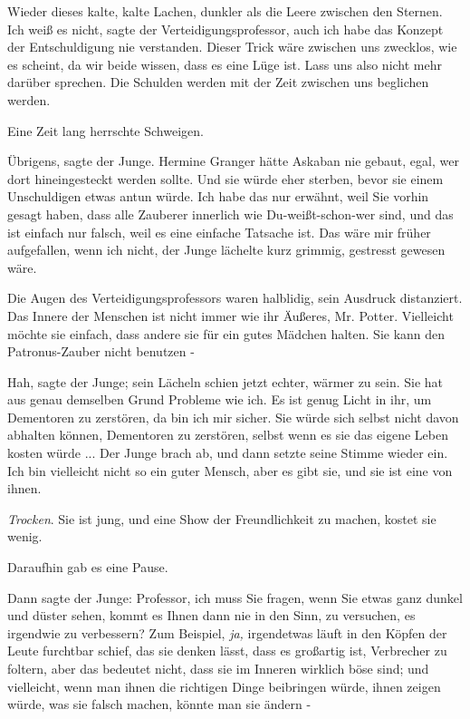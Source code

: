 Wieder dieses kalte, kalte Lachen, dunkler als die Leere zwischen den Sternen.
\glqq{}Ich weiß es nicht\grqq{}, sagte der Verteidigungsprofessor, \glqq{}auch ich
habe das Konzept der Entschuldigung nie verstanden. Dieser Trick wäre zwischen
uns zwecklos, wie es scheint, da wir beide wissen, dass es eine Lüge ist. Lass
uns also nicht mehr darüber sprechen. Die Schulden werden mit der Zeit zwischen
uns beglichen werden.\grqq{}

Eine Zeit lang herrschte Schweigen.

\glqq{}Übrigens\grqq{}, sagte der Junge. \glqq{}Hermine Granger hätte Askaban nie
gebaut, egal, wer dort hineingesteckt werden sollte. Und sie würde eher sterben,
bevor sie einem Unschuldigen etwas antun würde. Ich habe das nur erwähnt, weil
Sie vorhin gesagt haben, dass alle Zauberer innerlich wie Du-weißt-schon-wer
sind, und das ist einfach nur falsch, weil es eine einfache Tatsache ist. Das
wäre mir früher aufgefallen, wenn ich nicht\grqq{}, der Junge lächelte kurz
grimmig, \glqq{}gestresst gewesen wäre.\grqq{}

Die Augen des Verteidigungsprofessors waren halblidig, sein Ausdruck
distanziert. \glqq{}Das Innere der Menschen ist nicht immer wie ihr Äußeres, Mr.
Potter. Vielleicht möchte sie einfach, dass andere sie für ein gutes Mädchen
halten. Sie kann den Patronus-Zauber nicht benutzen -\grqq{}

\glqq{}Hah\grqq{}, sagte der Junge; sein Lächeln schien jetzt echter, wärmer zu
sein. \glqq{}Sie hat aus genau demselben Grund Probleme wie ich. Es ist genug
Licht in ihr, um Dementoren zu zerstören, da bin ich mir sicher. Sie würde sich
selbst nicht davon abhalten können, Dementoren zu zerstören, selbst wenn es sie
das eigene Leben kosten würde ...\grqq{} Der Junge brach ab, und dann setzte
seine Stimme wieder ein. \glqq{}Ich bin vielleicht nicht so ein guter Mensch,
aber es gibt sie, und sie ist eine von ihnen.\grqq{}

\emph{Trocken}. \glqq{}Sie ist jung, und eine Show der Freundlichkeit zu machen,
kostet sie wenig.\grqq{}

Daraufhin gab es eine Pause.

Dann sagte der Junge: \glqq{}Professor, ich muss Sie fragen, wenn Sie etwas ganz
dunkel und düster sehen, kommt es Ihnen dann nie in den Sinn, zu versuchen, es
irgendwie zu verbessern? Zum Beispiel,\emph{ ja,} irgendetwas läuft in den
Köpfen der Leute furchtbar schief, das sie denken lässt, dass es großartig ist,
Verbrecher zu foltern, aber das bedeutet nicht, dass sie im Inneren wirklich
böse sind; und vielleicht, wenn man ihnen die richtigen Dinge beibringen würde,
ihnen zeigen würde, was sie falsch machen, könnte man sie ändern -\grqq{}

